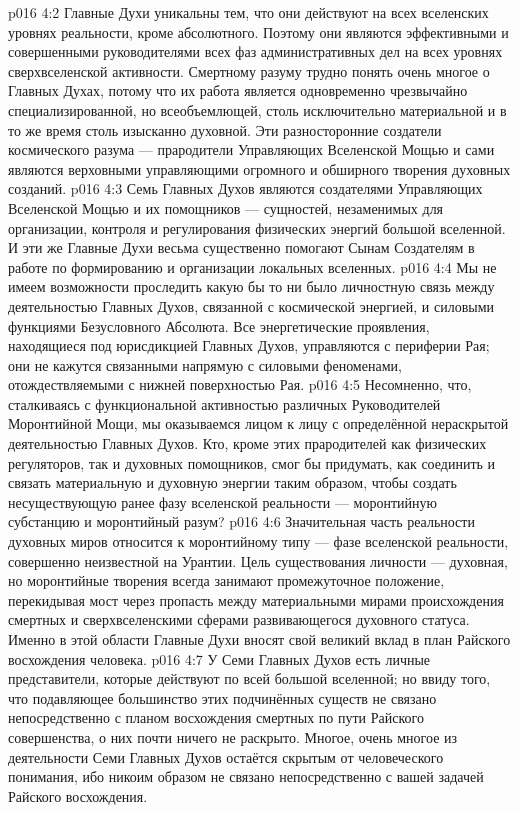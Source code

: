 \vs p016 4:2 Главные Духи уникальны тем, что они действуют на всех вселенских уровнях реальности, кроме абсолютного. Поэтому они являются эффективными и совершенными руководителями всех фаз административных дел на всех уровнях сверхвселенской активности. Смертному разуму трудно понять очень многое о Главных Духах, потому что их работа является одновременно чрезвычайно специализированной, но всеобъемлющей, столь исключительно материальной и в то же время столь изысканно духовной. Эти разносторонние создатели космического разума --- прародители Управляющих Вселенской Мощью и сами являются верховными управляющими огромного и обширного творения духовных созданий.
\vs p016 4:3 Семь Главных Духов являются создателями Управляющих Вселенской Мощью и их помощников --- сущностей, незаменимых для организации, контроля и регулирования физических энергий большой вселенной. И эти же Главные Духи весьма существенно помогают Сынам Создателям в работе по формированию и организации локальных вселенных.
\vs p016 4:4 Мы не имеем возможности проследить какую бы то ни было личностную связь между деятельностью Главных Духов, связанной с космической энергией, и силовыми функциями Безусловного Абсолюта. Все энергетические проявления, находящиеся под юрисдикцией Главных Духов, управляются с периферии Рая; они не кажутся связанными напрямую с силовыми феноменами, отождествляемыми с нижней поверхностью Рая.
\vs p016 4:5 Несомненно, что, сталкиваясь с функциональной активностью различных Руководителей Моронтийной Мощи, мы оказываемся лицом к лицу с определённой нераскрытой деятельностью Главных Духов. Кто, кроме этих прародителей как физических регуляторов, так и духовных помощников, смог бы придумать, как соединить и связать материальную и духовную энергии таким образом, чтобы создать несуществующую ранее фазу вселенской реальности --- моронтийную субстанцию и моронтийный разум?
\vs p016 4:6 Значительная часть реальности духовных миров относится к моронтийному типу --- фазе вселенской реальности, совершенно неизвестной на Урантии. Цель существования личности --- духовная, но моронтийные творения всегда занимают промежуточное положение, перекидывая мост через пропасть между материальными мирами происхождения смертных и сверхвселенскими сферами развивающегося духовного статуса. Именно в этой области Главные Духи вносят свой великий вклад в план Райского восхождения человека.
\vs p016 4:7 У Семи Главных Духов есть личные представители, которые действуют по всей большой вселенной; но ввиду того, что подавляющее большинство этих подчинённых существ не связано непосредственно с планом восхождения смертных по пути Райского совершенства, о них почти ничего не раскрыто. Многое, очень многое из деятельности Семи Главных Духов остаётся скрытым от человеческого понимания, ибо никоим образом не связано непосредственно с вашей задачей Райского восхождения.
